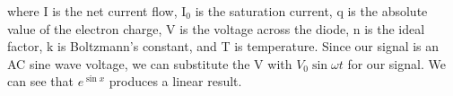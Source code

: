 \documentclass[11pt,letterpaper,onecolumn]{article}
\begin{document}
where I is the net current flow, $\mathrm{I_0}$ is the saturation current, q is the absolute value of the electron charge, V is the voltage across the diode, n is the ideal factor, k is Boltzmann's constant, and T is temperature.
Since our signal is an AC sine wave voltage, we can substitute the V with $V_0\sin{\omega t}$ for our signal. We can see that $e^{\sin{x}}$ produces a linear result.




\end{document}
